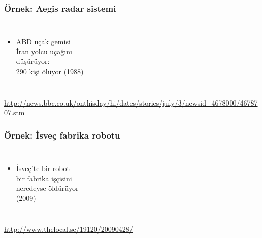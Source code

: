 \documentclass[dvipsnames]{beamer}
\theoremstyle{plain}
\begin{document}
\begin{frame}
  \frametitle{Örnek: Aegis radar sistemi}

  \begin{columns}

    \begin{itemize}
      \item ABD uçak gemisi\\
        İran yolcu uçağını\\
        düşürüyor:\\
        290 kişi ölüyor (1988)
    \end{itemize}
  \end{columns}

  \medskip
  \tiny{\url{http://news.bbc.co.uk/onthisday/hi/dates/stories/july/3/newsid_4678000/4678707.stm}}\\
\end{frame}

\begin{frame}
  \frametitle{Örnek: İsveç fabrika robotu}

  \begin{columns}

    \begin{itemize}
      \item İsveç'te bir robot\\
        bir fabrika işçisini\\
        neredeyse öldürüyor\\
        (2009)
    \end{itemize}
  \end{columns}

  \medskip
  \tiny{\url{http://www.thelocal.se/19120/20090428/}}\\
\end{frame}
\end{document}
